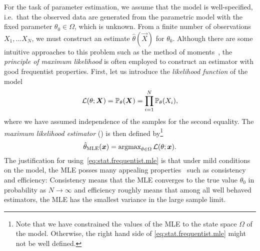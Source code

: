 For the task of parameter estimation, we assume that the model is well-specified, i.e.\ that the observed data are generated from the parametric model with the fixed  parameter $\theta_0 \in \Omega$, which is unknown.
From a finite number of observations $X_1, \ldots X_N$, we must construct an estimate $\hat\theta(\vec X)$ for $\theta_0$.
Although there are some intuitive approaches to this problem such as the method of moments~\cite[Sec.\ 9.2]{Wasserman_2013_All}, the \emph{principle of maximum likelihood} is often employed to construct an estimator with good frequentist properties.
First, let us introduce the \emph{likelihood function} of the model
\[
  \mathcal{L}(\theta; {\boldsymbol{X}}) = \mathbb{P}_\theta({\boldsymbol{X}}) = \prod_{i=1}^N \mathbb{P}_\theta(X_i),
  \label{eq:stat.frequentist.likelihood_function}
\]
where we have assumed independence of the samples for the second equality.
The \emph{maximum likelihood estimator} () is then defined by\footnote{%
  Note that we have constrained the values of the MLE to the state space $\Omega$ of the model.
  Otherwise, the right hand side of \cref{eq:stat.frequentist.mle} might not be well defined.
}
\[
  \hat{\theta}_\mathrm{MLE}({\boldsymbol{x}}) = \operatorname{argmax}_{\theta \in \Omega} \mathcal{L}(\theta; {\boldsymbol{x}}).
  \label{eq:stat.frequentist.mle}
\]
The justification for using~\eqref{eq:stat.frequentist.mle} is that under mild conditions on the model, the MLE posses many appealing properties~\cite[Sec.\ 9.4]{Wasserman_2013_All} such as consistency and efficiency:
Consistency means that the MLE converges to the true value $\theta_0$ in probability as $N \to \infty$ and efficiency roughly means that among all well behaved estimators, the MLE has the smallest variance in the large sample limit.

